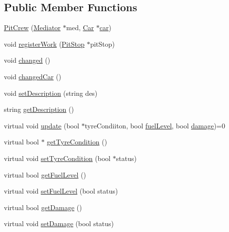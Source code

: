 \subsection*{Public Member Functions}
\begin{DoxyCompactItemize}
\item 
\mbox{\hyperlink{class_pit_crew_a49409297eb8e8b28ba1631858358f3de}{Pit\+Crew}} (\mbox{\hyperlink{class_mediator}{Mediator}} $\ast$med, \mbox{\hyperlink{class_car}{Car}} $\ast$\mbox{\hyperlink{class_pit_crew_ae2d97d82c1ae7061faf9b053329772e5}{car}})
\item 
void \mbox{\hyperlink{class_pit_crew_acf65dc9104c4286e663926689e7a3803}{register\+Work}} (\mbox{\hyperlink{class_pit_stop}{Pit\+Stop}} $\ast$pit\+Stop)
\item 
void \mbox{\hyperlink{class_pit_crew_a3d3613895533476934ba89ed592b5c6a}{changed}} ()
\item 
void \mbox{\hyperlink{class_pit_crew_a973e77f91c6110a1f6bda3ef71385b6e}{changed\+Car}} ()
\item 
void \mbox{\hyperlink{class_pit_crew_a15489fdb826cc62b7d83088ced1e3f8c}{set\+Description}} (string des)
\item 
string \mbox{\hyperlink{class_pit_crew_ad30e9eabf7e52b6a459b8a4816e43909}{get\+Description}} ()
\item 
virtual void \mbox{\hyperlink{class_pit_crew_a575e63653226346422eb2c2f8020d95d}{update}} (bool $\ast$tyre\+Condiiton, bool \mbox{\hyperlink{class_pit_crew_ad45840fa02b11a128e069ffcc7fdde47}{fuel\+Level}}, bool \mbox{\hyperlink{class_pit_crew_aa87241e1f87a430e1a92ed7010ccf554}{damage}})=0
\item 
virtual bool $\ast$ \mbox{\hyperlink{class_pit_crew_a7a527a6b4eccb6570dcad04b04dc1177}{get\+Tyre\+Condition}} ()
\item 
virtual void \mbox{\hyperlink{class_pit_crew_a281583ec0986aeec56fc70dd362fa31c}{set\+Tyre\+Condition}} (bool $\ast$status)
\item 
virtual bool \mbox{\hyperlink{class_pit_crew_a6960d91ce635df7f846301e21ae64450}{get\+Fuel\+Level}} ()
\item 
virtual void \mbox{\hyperlink{class_pit_crew_a8c137bb619ab3a331f4f1d7023477e4b}{set\+Fuel\+Level}} (bool status)
\item 
virtual bool \mbox{\hyperlink{class_pit_crew_a0cd6a3161f5b016241b3a6a51d526c4f}{get\+Damage}} ()
\item 
virtual void \mbox{\hyperlink{class_pit_crew_a41051dd7081efeac022cc3a35a592c64}{set\+Damage}} (bool status)
\end{DoxyCompactItemize}

